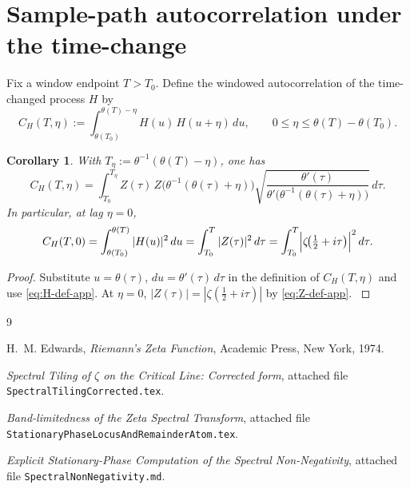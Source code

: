\documentclass[11pt]{article}
\newtheorem{corollary}[theorem]{Corollary}
\begin{document}
\section{Sample-path autocorrelation under the time-change}

Fix a window endpoint $T>T_{0}$. Define the windowed autocorrelation of
the time-changed process $H$ by
\[
C_{H}(T,\eta)
:=
\int_{\theta(T_{0})}^{\theta(T)-\eta}
H(u)\,H(u+\eta)\,du,
\qquad 0\le \eta\le \theta(T)-\theta(T_{0}).
\]

\begin{corollary}
\label{cor:CH-sample}
With $T_{\eta}:=\theta^{-1}(\theta(T)-\eta)$, one has
\begin{equation}
C_{H}(T,\eta)
=
\int_{T_{0}}^{T_{\eta}}
Z(\tau)\,Z\!\bigl(\theta^{-1}(\theta(\tau)+\eta)\bigr)
\sqrt{\frac{\theta'(\tau)}
           {\theta'\!\bigl(\theta^{-1}(\theta(\tau)+\eta)\bigr)}}\,d\tau.
\label{eq:CH-sample}
\end{equation}
In particular, at lag $\eta=0$,
\[
C_{H}(T,0)
=
\int_{\theta(T_{0})}^{\theta(T)} |H(u)|^{2}\,du
=
\int_{T_{0}}^{T} |Z(\tau)|^{2}\,d\tau
=
\int_{T_{0}}^{T}
\Bigl|\zeta\!\bigl(\tfrac12+i\tau\bigr)\Bigr|^{2}\,d\tau.
\]
\end{corollary}

\begin{proof}
Substitute $u=\theta(\tau)$, $du=\theta'(\tau)\,d\tau$ in the definition
of $C_{H}(T,\eta)$ and use \eqref{eq:H-def-app}. At $\eta=0$,
$|Z(\tau)|=|\zeta(\tfrac12+i\tau)|$ by \eqref{eq:Z-def-app}. \cite{StationaryPhase}
\end{proof}

\begin{thebibliography}{9}

H.~M. Edwards,
\emph{Riemann's Zeta Function},
Academic Press, New York, 1974.

\emph{Spectral Tiling of $\zeta$ on the Critical Line: Corrected form},
attached file \texttt{SpectralTilingCorrected.tex}.

\emph{Band-limitedness of the Zeta Spectral Transform},
attached file \texttt{StationaryPhaseLocusAndRemainderAtom.tex}.

\emph{Explicit Stationary-Phase Computation of the Spectral Non-Negativity},
attached file \texttt{SpectralNonNegativity.md}.

\end{thebibliography}
\end{document}
